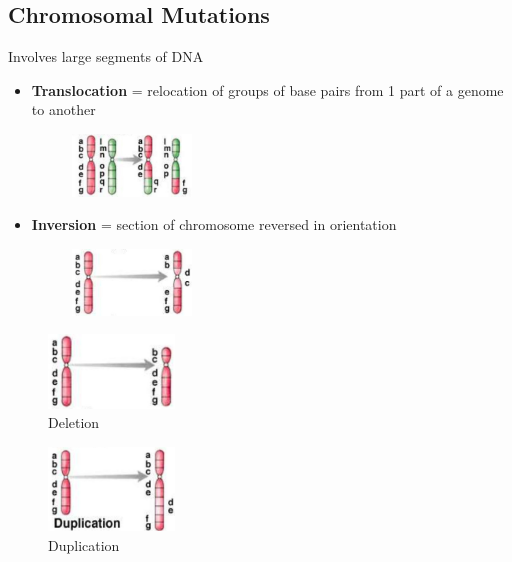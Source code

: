 \documentclass[a4paper,12pt]{article}
\begin{document}
\subsection{Chromosomal Mutations}
Involves large segments of DNA

\begin{itemize}
    \item{
            \textbf{Translocation} = relocation of groups of base pairs from 1 part of a genome to another
            \begin{figure}[H]
                \centering
                \includegraphics[width=0.3\textwidth]{translocation}
            \end{figure}
        }
    \item{
            \textbf{Inversion} = section of chromosome reversed in orientation
            \begin{figure}[H]
                \centering
                \includegraphics[width=0.3\textwidth]{inversion}
            \end{figure}
        }
\end{itemize}
\begin{figure}[H]
    \centering
    \includegraphics[width=0.3\textwidth]{deletion3}
    \caption{Deletion}
\end{figure}
\begin{figure}[H]
    \centering
    \includegraphics[width=0.3\textwidth]{duplication}
    \caption{Duplication}
\end{figure}
\end{document}
